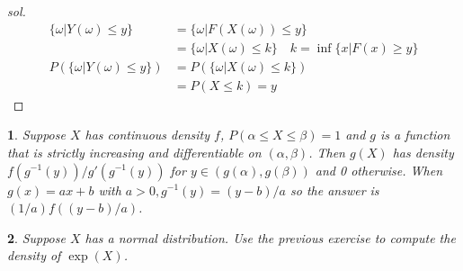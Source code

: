 \documentclass{report}
\newtheorem{ex}{}[section]
\begin{document}
\begin{proof}[sol]
\begin{align*}
    \{\omega | Y(\omega) \le y\} &= \{\omega | F(X(\omega)) \le y\}\\
    &= \{\omega | X(\omega) \le k\} \quad k = \inf\{x | F(x) \ge y \}\\
    P(\{\omega | Y(\omega) \le y\}) &= P(\{\omega | X(\omega) \le k\})\\
    &= P(X \le k) = y
\end{align*}
\end{proof}
\begin{ex}
Suppose $X$ has continuous density $f$, $P(\alpha \le X \le \beta) = 1$ and $g$ is a function that is strictly increasing and differentiable on $(\alpha, \beta)$. Then $g(X)$ has density $f(g^{-1}(y))/g'(g^{-1}(y))$ for $y \in (g(\alpha), g(\beta))$ and 0 otherwise. When $g(x) = ax + b$ with $a > 0, g^{-1}(y) = (y - b)/a$ so the answer is $(1/a)f((y - b)/a)$.
\end{ex}
\begin{ex}
Suppose $X$ has a normal distribution. Use the previous exercise to compute the density of $\exp(X)$.
\end{ex}
\end{document}
